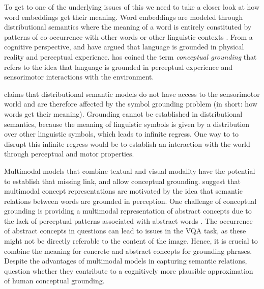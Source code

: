 \documentclass{article}
\begin{document}
To get to one of the underlying issues of this we need to take a closer look at how word embeddings get their meaning. Word embeddings are modeled through distributional semantics where the meaning of a word is entirely constituted by patterns of co-occurrence with other words or other linguistic contexts \citep{baroni2016grounding}. From a cognitive perspective, \citet{barsalou1999perceptual} and \citet{fincher2001perceptual} have argued that language is grounded in physical reality and perceptual experience. \citet{barsalou2008grounded} has coined the term \textit{conceptual grounding} that refers to the idea that language is grounded in perceptual experience and sensorimotor interactions with the environment.

\citet{baroni2016grounding} claims that distributional semantic models do not have access to the sensorimotor world and are therefore affected by the symbol grounding problem \citet{harnad1990symbol} (in short: how words get their meaning). Grounding cannot be established in distributional semantics, because the meaning of linguistic symbols is given by a distribution over other linguistic symbols, which leads to infinite regress. One way to to disrupt this infinite regress would be to establish an interaction with the world through perceptual and motor properties.

Multimodal models that combine textual and visual modality have the potential to establish that missing link, and allow conceptual grounding. \citet{beinborn2018multimodal} suggest that multimodal concept representations are motivated by the idea that semantic relations between words are grounded in perception. One challenge of conceptual grounding is providing a multimodal representation of abstract concepts due to the lack of perceptual patterns associated with abstract words \citet{hill2014multi}. The occurrence of abstract concepts in questions can lead to issues in the VQA task, as these might not be directly referable to the content of the image. Hence, it is crucial to combine the meaning for concrete and abstract concepts for grounding phrases. Despite the advantages of multimodal models in capturing semantic relations, \citet{beinborn2018multimodal} question whether they contribute to a cognitively more plausible approximation of human conceptual grounding.
\end{document}
